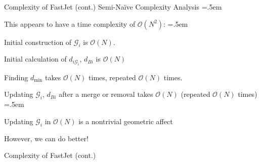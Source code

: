 \documentclass[xcolor={dvipsnames}]{beamer}
\let\olditemize=\itemize
\let\endolditemize=\enditemize
\renewenvironment{itemize}{\olditemize \itemsep=.5em }{\endolditemize}
\newcommand{\ord}[1]{\mathcal{O}(#1)}
\begin{document}
\begin{frame}{Complexity of FastJet (cont.)}
\alert{Semi-Naïve Complexity Analysis}
\begin{itemize}
    \item<2-> This appears to have a time complexity of $\ord{N^2}$:
    \begin{itemize}
        \item<3-> Initial construction of $\mathcal{G}_i$ is $\ord{N}$.
        \item<4-> Initial calculation of $d_{i\mathcal{G}_i}$, $d_{Bi}$ is $\ord{N}$
        \item<5-> Finding $d_\text{min}$ takes $\ord{N}$ times, repeated $\ord{N}$ times.
        \item<6-> Updating $\mathcal{G}_i$, $d_{Bi}$ after a merge or removal takes $\ord{N}$ (repeated $\ord{N}$ times)
        \begin{itemize}
            \item<7-> Updating $\mathcal{G}_i$ in $\ord{N}$ is a nontrivial geometric affect
        \end{itemize}
    \end{itemize}
    \item<8-> However, we can do better!
\end{itemize}
\end{frame}

\begin{frame}{Complexity of FastJet (cont.)}
    \begin{figure}
        \centering
    \end{figure}
\end{frame}
\end{document}
